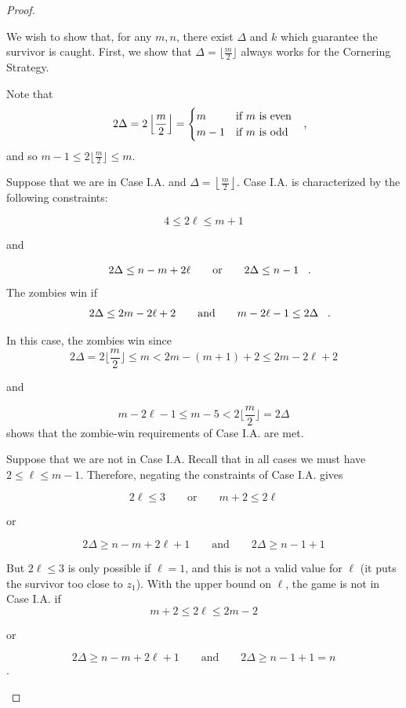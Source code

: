 \begin{proof}
\begin{proofpart}
We wish to show that, for any $m, n$, there exist $\Delta$ and $k$
which guarantee the survivor is caught.
First, we show that $\Delta = \lfloor \frac{m}{2} \rfloor$ always
works for the Cornering Strategy.

Note that
\[
2\Delta = 2 \left\lfloor \frac{m}{2} \right\rfloor =
\begin{cases}
m & \text{if $m$ is even} \\
m -1 & \text{if $m$ is odd}
\end{cases} \mcomma
\]
and so $m -1 \leq 2 \lfloor \frac{m}{2} \rfloor \leq m$.

Suppose that we are in Case I.A. and $\Delta = \left\lfloor \frac{m}{2} \right\rfloor$.
Case I.A. is characterized by the following constraints:

\[ 4 \leq 2 \ell \leq m+1 \]
\begin{center}and\end{center}
\[ 2\Delta \leq n - m + 2\ell \qquad \text{or} \qquad 2\Delta \leq n-1 \mperiod \]
The zombies win if
\[ 2 \Delta \leq 2 m- 2 \ell + 2 \qquad \text{and} \qquad m - 2\ell  -1 \leq 2 \Delta \mperiod \]

In this case, the zombies win since
\[ 2 \Delta = 2 \lfloor \frac{m}{2} \rfloor \leq m < 2m - (m+1) + 2\leq 2 m- 2 \ell + 2 \]
\begin{center}and\end{center}
\[ m - 2\ell -1 \leq m - 5 < 2 \lfloor \frac{m}{2} \rfloor = 2 \Delta \]
shows that the zombie-win requirements of Case I.A. are met.

Suppose that we are not in Case I.A. Recall that in all cases we must have $2 \leq \ell \leq m-1$. Therefore, negating the constraints of Case I.A. gives

\[2\ell \leq 3 \qquad \text{or} \qquad m+2 \leq 2 \ell \]
\begin{center}or\end{center}
\[ 2\Delta \geq n - m + 2\ell +1 \qquad \text{and} \qquad 2 \Delta \geq n - 1 + 1 \]

But $2\ell \leq 3$ is only possible if $\ell = 1$, and this is not a valid value for $\ell$ (it puts the survivor too close to $z_1$). With the upper bound on $\ell$, the game is not in Case I.A. if
\[m+2 \leq 2 \ell \leq 2m-2\]
\begin{center}or\end{center}
\[ 2\Delta \geq n - m + 2\ell +1 \qquad \text{and} \qquad 2 \Delta \geq n - 1 + 1 = n \tag{*} \label{not i a}\].


\end{proofpart}
\end{proof}
